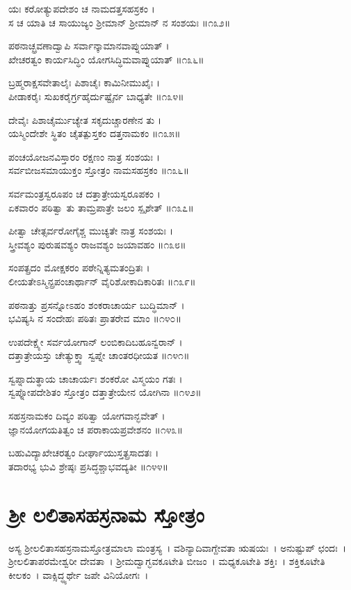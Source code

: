 ಯಃ ಕರೋತ್ಯುಪದೇಶಂ ಚ ನಾಮದತ್ತಸಹಸ್ರಕಂ ।\\
ಸ ಚ ಯಾತಿ ಚ ಸಾಯುಜ್ಯಂ ಶ್ರೀಮಾನ್ ಶ್ರೀಮಾನ್ ನ ಸಂಶಯಃ ॥೧೩೨॥

ಪಠನಾಚ್ಛ್ರವಣಾದ್ವಾಪಿ ಸರ್ವಾನ್ಕಾಮಾನವಾಪ್ನುಯಾತ್ ।\\
ಖೇಚರತ್ವಂ ಕಾರ್ಯಸಿದ್ಧಿಂ ಯೋಗಸಿದ್ಧಿಮವಾಪ್ನುಯಾತ್ ॥೧೩೬॥

ಬ್ರಹ್ಮರಾಕ್ಷಸವೇತಾಲೈಃ ಪಿಶಾಚೈಃ ಕಾಮಿನೀಮುಖೈಃ ।\\
ಪೀಡಾಕರೈಃ ಸುಖಕರೈರ್ಗ್ರಹೈರ್ದುಷ್ಟೈರ್ನ ಬಾಧ್ಯತೇ ॥೧೩೪॥

ದೇವೈಃ ಪಿಶಾಚೈರ್ಮುಚ್ಯೇತ ಸಕೃದುಚ್ಚಾರಣೇನ ತು ।\\
ಯಸ್ಮಿಂದೇಶೇ ಸ್ಥಿತಂ ಚೈತತ್ಪುಸ್ತಕಂ ದತ್ತನಾಮಕಂ ॥೧೩೫॥

ಪಂಚಯೋಜನವಿಸ್ತಾರಂ ರಕ್ಷಣಂ ನಾತ್ರ ಸಂಶಯಃ ।\\
ಸರ್ವಬೀಜಸಮಾಯುಕ್ತಂ ಸ್ತೋತ್ರಂ ನಾಮಸಹಸ್ರಕಂ ॥೧೩೬॥

ಸರ್ವಮಂತ್ರಸ್ವರೂಪಂ ಚ ದತ್ತಾತ್ರೇಯಸ್ವರೂಪಕಂ ।\\
ಏಕವಾರಂ ಪಠಿತ್ವಾ ತು ತಾಮ್ರಪಾತ್ರೇ ಜಲಂ ಸ್ಪೃಶೇತ್ ॥೧೩೭॥

ಪೀತ್ವಾ ಚೇತ್ಸರ್ವರೋಗೈಶ್ಚ ಮುಚ್ಯತೇ ನಾತ್ರ ಸಂಶಯಃ ।\\
ಸ್ತ್ರೀವಶ್ಯಂ ಪುರುಷವಶ್ಯಂ ರಾಜವಶ್ಯಂ ಜಯಾವಹಂ ॥೧೩೮॥

ಸಂಪತ್ಪ್ರದಂ ಮೋಕ್ಷಕರಂ ಪಠೇನ್ನಿತ್ಯಮತಂದ್ರಿತಃ ।\\
ಲೀಯತೇಽಸ್ಮಿನ್ಪ್ರಪಂಚಾರ್ಥಾನ್ ವೈರಿಶೋಕಾದಿಕಾರಿತಃ ॥೧೩೯॥

ಪಠನಾತ್ತು ಪ್ರಸನ್ನೋಽಹಂ ಶಂಕರಾಚಾರ್ಯ ಬುದ್ಧಿಮಾನ್ ।\\
ಭವಿಷ್ಯಸಿ ನ ಸಂದೇಹಃ ಪಠಿತಃ ಪ್ರಾತರೇವ ಮಾಂ ॥೧೪೦॥

ಉಪದೇಕ್ಷ್ಯೇ ಸರ್ವಯೋಗಾನ್ ಲಂಬಿಕಾದಿಬಹೂನ್ವರಾನ್ ।\\
ದತ್ತಾತ್ರೇಯಸ್ತು ಚೇತ್ಯುಕ್ತ್ವಾ ಸ್ವಪ್ನೇ ಚಾಂತರಧೀಯತ ॥೧೪೧॥

ಸ್ವಪ್ನಾದುತ್ಥಾಯ ಚಾಚಾರ್ಯಃ ಶಂಕರೋ ವಿಸ್ಮಯಂ ಗತಃ ।\\
ಸ್ವಪ್ನೋಪದೇಶಿತಂ ಸ್ತೋತ್ರಂ ದತ್ತಾತ್ರೇಯೇನ ಯೋಗಿನಾ ॥೧೪೨॥

ಸಹಸ್ರನಾಮಕಂ ದಿವ್ಯಂ ಪಠಿತ್ವಾ ಯೋಗವಾನ್ಭವೇತ್ ।\\
ಜ್ಞಾನಯೋಗಯತಿತ್ವಂ ಚ ಪರಾಕಾಯಪ್ರವೇಶನಂ ॥೧೪೩॥

ಬಹುವಿದ್ಯಾಖೇಚರತ್ವಂ ದೀರ್ಘಾಯುಸ್ತತ್ಪ್ರಸಾದತಃ ।\\
ತದಾರಭ್ಯ ಭುವಿ ಶ್ರೇಷ್ಠಃ ಪ್ರಸಿದ್ಧಶ್ಚಾಭವದ್ಯತೀ ॥೧೪೪॥
\section{ ಶ್ರೀ ಲಲಿತಾಸಹಸ್ರನಾಮ ಸ್ತೋತ್ರಂ }
ಅಸ್ಯ ಶ್ರೀಲಲಿತಾಸಹಸ್ರನಾಮಸ್ತೋತ್ರಮಾಲಾ ಮಂತ್ರಸ್ಯ~। ವಶಿನ್ಯಾದಿವಾಗ್ದೇವತಾ ಋಷಯಃ~। ಅನುಷ್ಟುಪ್ ಛಂದಃ~। ಶ್ರೀಲಲಿತಾಪರಮೇಶ್ವರೀ ದೇವತಾ~। ಶ್ರೀಮದ್ವಾಗ್ಭವಕೂಟೇತಿ ಬೀಜಂ~। ಮಧ್ಯಕೂಟೇತಿ ಶಕ್ತಿಃ~। ಶಕ್ತಿಕೂಟೇತಿ ಕೀಲಕಂ~। ವಾಕ್ಸಿದ್ಧ್ಯರ್ಥೇ ಜಪೇ ವಿನಿಯೋಗಃ~।

